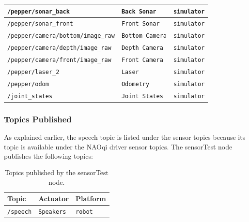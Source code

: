 \documentclass{CSSRforAfrica}
\begin{document}
\begin{longtable}[c]{|p{8cm}|p{4.2cm}|l|}
	\small{\texttt{/pepper/sonar\_back}} & \small{\texttt{Back Sonar}} & \small{\texttt{simulator}} \\ \hline
	\small{\texttt{/pepper/sonar\_front}} & \small{\texttt{Front Sonar}} & \small{\texttt{simulator}} \\ \hline
	\small{\texttt{/pepper/camera/bottom/image\_raw}} & \small{\texttt{Bottom Camera}} & \small{\texttt{simulator}} \\ \hline
	\small{\texttt{/pepper/camera/depth/image\_raw}} & \small{\texttt{Depth Camera}} & \small{\texttt{simulator}} \\ \hline
	\small{\texttt{/pepper/camera/front/image\_raw}} & \small{\texttt{Front Camera}} & \small{\texttt{simulator}} \\ \hline
	\small{\texttt{/pepper/laser\_2}} & \small{\texttt{Laser}} & \small{\texttt{simulator}} \\ \hline
	\small{\texttt{/pepper/odom}} & \small{\texttt{Odometry}} & \small{\texttt{simulator}} \\ \hline
	\small{\texttt{/joint\_states}} & \small{\texttt{Joint States}} & \small{\texttt{simulator}} \\ \hline
	
\end{longtable}

\subsubsection*{Topics Published}
As explained earlier, the speech topic is listed under the sensor topics because its topic is available under the NAOqi driver sensor topics. The sensorTest node publishes the following topics:
\begin{longtable}[c]{|p{8cm}|p{4cm}|p{1.7cm}|}
	\caption{Topics published by the sensorTest node.} \label{tab:published_topics}\\
	\hline
	\rowcolor{gray!30}
	\small{\textbf{Topic}} & \small{\textbf{Actuator}} & \small{\textbf{Platform}} \\ \hline
	\endhead %
	
	\small{\texttt{/speech}} & \small{\texttt{Speakers}} & \small{\texttt{robot}} \\ \hline
	
\end{longtable}
\end{document}
